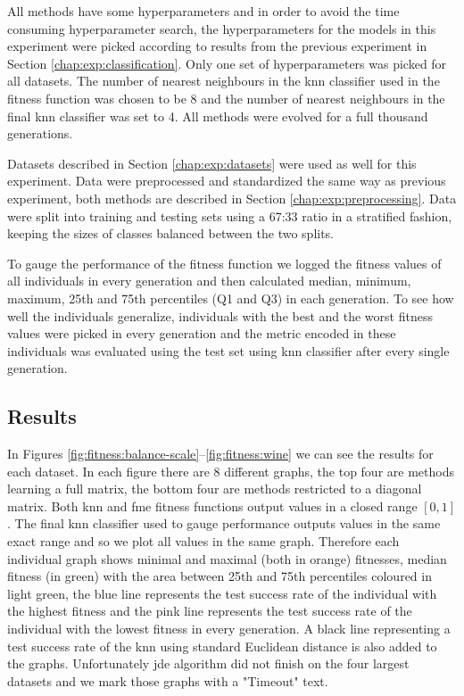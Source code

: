 \documentclass[12pt,a4paper]{report}
\begin{document}
All methods have some hyperparameters and in order to avoid the time consuming hyperparameter search, the hyperparameters for the models in this experiment were picked according to results from the previous experiment in Section \ref{chap:exp:classification}. Only one set of hyperparameters was picked for all datasets. The number of nearest neighbours in the \ac{knn} classifier used in the fitness function was chosen to be 8 and the number of nearest neighbours in the final \ac{knn} classifier was set to 4. All methods were evolved for a full thousand generations.

Datasets described in Section \ref{chap:exp:datasets} were used as well for this experiment. Data were preprocessed and standardized the same way as previous experiment, both methods are described in Section \ref{chap:exp:preprocessing}. Data were split into training and testing sets using a 67:33 ratio in a stratified fashion, keeping the sizes of classes balanced between the two splits.

To gauge the performance of the fitness function we logged the fitness values of all individuals in every generation and then calculated median, minimum, maximum, 25th and 75th percentiles (Q1 and Q3) in each generation. To see how well the individuals generalize, individuals with the best and the worst fitness values were picked in every generation and the metric encoded in these individuals was evaluated using the test set using \ac{knn} classifier after every single generation.

\subsection{Results}

In Figures \ref{fig:fitness:balance-scale}--\ref{fig:fitness:wine} we can see the results for each dataset. In each figure there are 8 different graphs, the top four are methods learning a full matrix, the bottom four are methods restricted to a diagonal matrix. Both \ac{knn} and \ac{fme} fitness functions output values in a closed range $[0,1]$. The final \ac{knn} classifier used to gauge performance outputs values in the same exact range and so we plot all values in the same graph. Therefore each individual graph shows minimal and maximal (both in orange) fitnesses, median fitness (in green) with the area between 25th and 75th percentiles coloured in light green, the blue line represents the test success rate of the individual with the highest fitness and the pink line represents the test success rate of the individual with the lowest fitness in every generation. A black line representing a test success rate of the \ac{knn} using standard Euclidean distance is also added to the graphs. Unfortunately \ac{jde} algorithm did not finish on the four largest datasets and we mark those graphs with a "Timeout" text.
\end{document}
